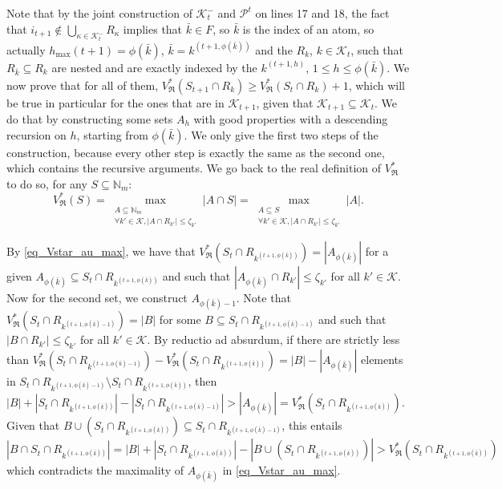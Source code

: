 \documentclass[
  11pt,
  a4paper,
]{article}
\theoremstyle{definition}
\theoremstyle{plain}
\theoremstyle{plain}
\theoremstyle{plain}
\theoremstyle{definition}
\theoremstyle{remark}
\begin{document}
Note that by the joint construction of \(\mathcal{K}^-_t\) and
\(\mathcal{P}^t\) on lines 17 and 18, the fact that
\(i_{t+1}\not\in\bigcup_{\kappa\in\mathcal{K}^-_{t}}R_{\kappa}\) implies
that \(\bar k\in F\), so \(\bar k\) is the index of an atom, so actually
\(h_{\max}(t+1)=\phi(\bar k)\), \(\bar k = k^{(t+1,\phi(\bar k))}\) and
the \(R_k\), \(k\in\mathcal{K}_{t}\), such that
\(R_{\bar k}\subseteq R_k\) are nested and are exactly indexed by the
\(k^{(t+1,h)}\), \(1\leq h\leq \phi(\bar k)\). We now prove that for all
of them,
\(V^*_{\mathfrak{R}}(S_{t+1}\cap R_k)\geq V^*_{\mathfrak{R}}(S_{t}\cap R_k)+1\),
which will be true in particular for the ones that are in
\(\mathcal{K}_{t+1}\), given that
\(\mathcal{K}_{t+1}\subseteq \mathcal{K}_t\). We do that by constructing
some sets \(A_h\) with good properties with a descending recursion on
\(h\), starting from \(\phi(\bar k)\). We only give the first two steps
of the construction, because every other step is exactly the same as the
second one, which contains the recursive arguments. We go back to the
real definition of \(V^*_{\mathfrak{R}}\) to do so, for any
\(S\subseteq \mathbb{N}_m\): \begin{equation}
\label{eq_Vstar_au_max} V^*_{\mathfrak{R}}(S)=\max_{\substack{A\subseteq \mathbb{N}_m\\\forall k'\in\mathcal{K}, |A\cap R_{k'}|\leq \zeta_{k'}}} |A\cap S| =\max_{\substack{A\subseteq S\\\forall k'\in\mathcal{K}, |A\cap R_{k'}|\leq \zeta_{k'}}} |A|  . 
\end{equation}

By \eqref{eq_Vstar_au_max}, we have that
\(V^*_{\mathfrak{R}}(S_t \cap R_{k^{(t+1,\phi(\bar k))}})=|A_{\phi(\bar k)}|\)
for a given
\(A_{\phi(\bar k)}\subseteq S_t \cap R_{k^{(t+1,\phi(\bar k))}}\) and
such that \(|A_{\phi(\bar k)}\cap R_{k'}|\leq \zeta_{k'}\) for all
\(k'\in\mathcal{K}\). Now for the second set, we construct
\(A_{\phi(\bar k)-1}\). Note that
\(V^*_{\mathfrak{R}}(S_t \cap R_{k^{(t+1,\phi(\bar k)-1)}})=|B|\) for
some \(B\subseteq S_t \cap R_{k^{(t+1,\phi(\bar k)-1)}}\) and such that
\(|B\cap R_{k'}|\leq \zeta_{k'}\) for all \(k'\in\mathcal{K}\). By
reductio ad absurdum, if there are strictly less than
\(V^*_{\mathfrak{R}}(S_t \cap R_{k^{(t+1,\phi(\bar k)-1)}}) - V^*_{\mathfrak{R}}(S_t \cap R_{k^{(t+1,\phi(\bar k))}})=|B|-|A_{\phi(\bar k)}|\)
elements in
\(S_t\cap R_{k^{(t+1,\phi(\bar k)-1)}} \setminus S_t\cap R_{k^{(t+1,\phi(\bar k))}}\),
then
\(|B|+|S_t \cap R_{k^{(t+1,\phi(\bar k))}}|-|S_t \cap R_{k^{(t+1,\phi(\bar k)-1)}}|>|A_{\phi(\bar k)}|=V^*_{\mathfrak{R}}(S_t \cap R_{k^{(t+1,\phi(\bar k))}})\).
Given that
\(B\cup (S_t\cap R_{k^{(t+1,\phi(\bar k))}})\subseteq S_t \cap R_{k^{(t+1,\phi(\bar k)-1)}}\),
this entails
\(|B\cap S_t\cap R_{k^{(t+1,\phi(\bar k))}}| =|B|+|S_t \cap R_{k^{(t+1,\phi(\bar k))}}| -| B\cup (S_t\cap R_{k^{(t+1,\phi(\bar k))}})| > V^*_{\mathfrak{R}}(S_t \cap R_{k^{(t+1,\phi(\bar k))}})\)
which contradicts the maximality of \(A_{\phi(\bar k)}\) in
\eqref{eq_Vstar_au_max}.
\end{document}
